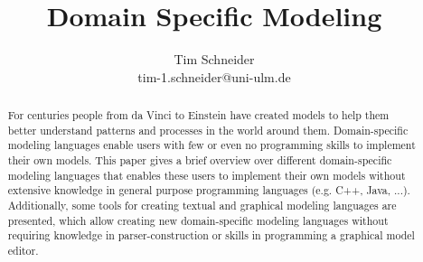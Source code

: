 \documentclass[runningheads,a4paper]{llncs}
\begin{document}
\mainmatter  %

\title{Domain Specific Modeling}



\author{Tim Schneider\\ tim-1.schneider@uni-ulm.de}


\maketitle


\begin{abstract}
For centuries people from da Vinci to Einstein have created models to help them better 
understand patterns and processes in the world around them. 
Domain-specific modeling languages enable users with few or even no programming skills to implement their own models.
This paper gives a  brief overview over different domain-specific modeling languages that enables these users 
to implement their own models without extensive knowledge in general purpose programming languages (e.g. C++, Java, ...).
Additionally, some tools for creating textual and graphical modeling languages are presented, which allow 
creating new domain-specific modeling languages without requiring knowledge in parser-construction or 
skills in programming a graphical model editor.
\end{abstract}
\end{document}
